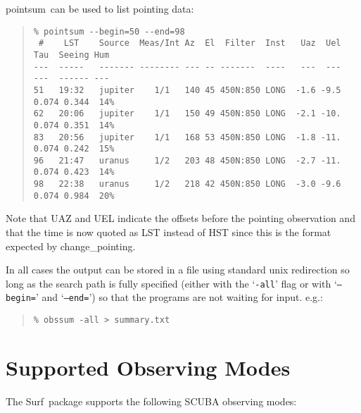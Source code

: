 \documentclass[twoside,11pt]{article}
\newcommand{\scusoft}          {{\sc Surf}}
\newcommand{\task}[1]{{\sf #1}}
\newcommand{\chgpnt}{\htmlref{\task{change\_pointing}}{CHANGE_POINTING}}
\newcommand{\pointsum}{\htmlref{\task{pointsum}}{POINTSUM}}
\newenvironment{myquote}{\begin{quote}\begin{small}}{\end{small}\end{quote}}
\newcommand{\htmlref}[2]{#1}
\newcommand{\xlabel}[1]{}
\begin{document}
\pointsum\ can be used to list pointing data:
\begin{myquote}
\begin{verbatim}
% pointsum --begin=50 --end=98
 #    LST    Source  Meas/Int Az  El  Filter  Inst   Uaz  Uel   Tau  Seeing Hum
---  -----   ------- -------- --- -- -------  ----   ---  ---   ---  ------ ---
51   19:32   jupiter    1/1   140 45 450N:850 LONG  -1.6 -9.5  0.074 0.344  14%
62   20:06   jupiter    1/1   150 49 450N:850 LONG  -2.1 -10.  0.074 0.351  14%
83   20:56   jupiter    1/1   168 53 450N:850 LONG  -1.8 -11.  0.074 0.242  15%
96   21:47   uranus     1/2   203 48 450N:850 LONG  -2.7 -11.  0.074 0.423  14%
98   22:38   uranus     1/2   218 42 450N:850 LONG  -3.0 -9.6  0.074 0.984  20%
\end{verbatim}
\end{myquote}
Note that UAZ and UEL indicate the offsets before the pointing observation
and that the time is now quoted as LST instead of HST since this is the format
expected by \chgpnt.

In all cases the output can be stored in a file using standard unix
redirection so long as the search path is fully specified (either with the
`\texttt{-all}' flag or with `\texttt{--begin=}' and `\texttt{--end=}') so
that the programs are not waiting for input. e.g.:
\begin{myquote}
\begin{verbatim}
% obssum -all > summary.txt
\end{verbatim}
\end{myquote}


\section{\xlabel{obsmodes}Supported Observing Modes\label{obsmodes}}

The \scusoft\ package supports the following SCUBA observing modes:
\end{document}
